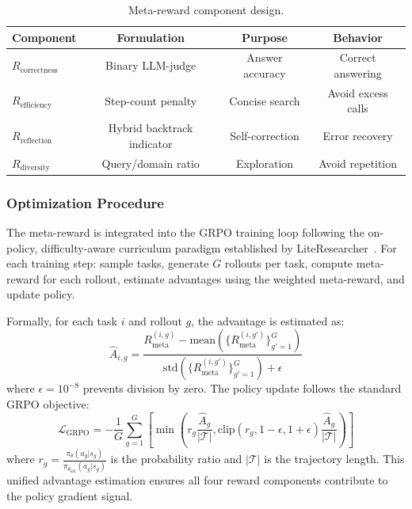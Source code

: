 \documentclass[notspecified,article,accept,pdftex,moreauthors]{Definitions/mdpi}
\renewcommand{\textbf}[1]{#1}
\begin{document}
\begin{table}[H]
\centering
\caption{Meta-reward component design.}
\label{tab:reward}
\renewcommand{\arraystretch}{1.15}
\begin{tabular}{lccc}
\toprule
\textbf{Component} & \textbf{Formulation} & \textbf{Purpose} & \textbf{Behavior} \\
\midrule
$R_{\text{correctness}}$ & Binary LLM-judge & Answer accuracy & Correct answering \\
$R_{\text{efficiency}}$ & Step-count penalty & Concise search & Avoid excess calls \\
$R_{\text{reflection}}$ & Hybrid backtrack indicator & Self-correction & Error recovery \\
$R_{\text{diversity}}$ & Query/domain ratio & Exploration & Avoid repetition \\
\bottomrule
\end{tabular}
\end{table}

\subsubsection{Optimization Procedure}
The meta-reward is integrated into the GRPO training loop following the on-policy, difficulty-aware curriculum paradigm established by LiteResearcher~\cite{b1}. For each training step: sample tasks, generate $G$ rollouts per task, compute meta-reward for each rollout, estimate advantages using the weighted meta-reward, and update policy.

Formally, for each task $i$ and rollout $g$, the advantage is estimated as:
\begin{equation}
\hat{A}_{i,g} = \frac{R_{\text{meta}}^{(i,g)} - \text{mean}(\{R_{\text{meta}}^{(i,g')}\}_{g'=1}^G)}{\text{std}(\{R_{\text{meta}}^{(i,g')}\}_{g'=1}^G) + \epsilon}
\end{equation}
where $\epsilon = 10^{-8}$ prevents division by zero. The policy update follows the standard GRPO objective:
\begin{equation}
\mathcal{L}_{\text{GRPO}} = -\frac{1}{G}\sum_{g=1}^{G}\left[\min\left(r_{g}\frac{\hat{A}_{g}}{|\mathcal{T}|}, \text{clip}(r_{g}, 1-\epsilon, 1+\epsilon)\frac{\hat{A}_{g}}{|\mathcal{T}|}\right)\right]
\end{equation}
where $r_g = \frac{\pi_\theta(a_g|s_g)}{\pi_{\theta_{\text{old}}}(a_g|s_g)}$ is the probability ratio and $|\mathcal{T}|$ is the trajectory length. This unified advantage estimation ensures all four reward components contribute to the policy gradient signal.
\label{sec:multi-agent}
\end{document}
